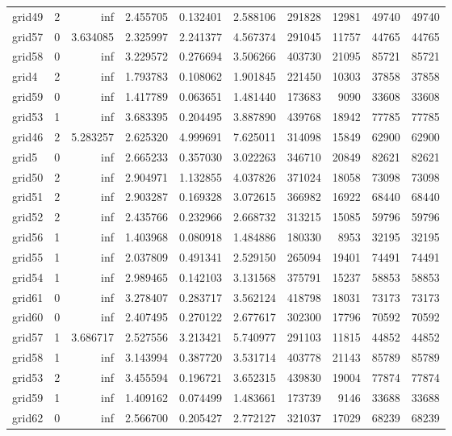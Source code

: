 \documentclass[../../../thesis.tex]{subfiles}
\begin{document}
\begin{longtable}{|l|r|r|r|r|r|r|r|r|r|}
grid49 & 2 & inf & 2.455705 & 0.132401 & 2.588106 & 291828 & 12981 & 49740 & 49740 \\
grid57 & 0 & 3.634085 & 2.325997 & 2.241377 & 4.567374 & 291045 & 11757 & 44765 & 44765 \\
grid58 & 0 & inf & 3.229572 & 0.276694 & 3.506266 & 403730 & 21095 & 85721 & 85721 \\
grid4 & 2 & inf & 1.793783 & 0.108062 & 1.901845 & 221450 & 10303 & 37858 & 37858 \\
grid59 & 0 & inf & 1.417789 & 0.063651 & 1.481440 & 173683 & 9090 & 33608 & 33608 \\
grid53 & 1 & inf & 3.683395 & 0.204495 & 3.887890 & 439768 & 18942 & 77785 & 77785 \\
grid46 & 2 & 5.283257 & 2.625320 & 4.999691 & 7.625011 & 314098 & 15849 & 62900 & 62900 \\
grid5 & 0 & inf & 2.665233 & 0.357030 & 3.022263 & 346710 & 20849 & 82621 & 82621 \\
grid50 & 2 & inf & 2.904971 & 1.132855 & 4.037826 & 371024 & 18058 & 73098 & 73098 \\
grid51 & 2 & inf & 2.903287 & 0.169328 & 3.072615 & 366982 & 16922 & 68440 & 68440 \\
grid52 & 2 & inf & 2.435766 & 0.232966 & 2.668732 & 313215 & 15085 & 59796 & 59796 \\
grid56 & 1 & inf & 1.403968 & 0.080918 & 1.484886 & 180330 & 8953 & 32195 & 32195 \\
grid55 & 1 & inf & 2.037809 & 0.491341 & 2.529150 & 265094 & 19401 & 74491 & 74491 \\
grid54 & 1 & inf & 2.989465 & 0.142103 & 3.131568 & 375791 & 15237 & 58853 & 58853 \\
grid61 & 0 & inf & 3.278407 & 0.283717 & 3.562124 & 418798 & 18031 & 73173 & 73173 \\
grid60 & 0 & inf & 2.407495 & 0.270122 & 2.677617 & 302300 & 17796 & 70592 & 70592 \\
grid57 & 1 & 3.686717 & 2.527556 & 3.213421 & 5.740977 & 291103 & 11815 & 44852 & 44852 \\
grid58 & 1 & inf & 3.143994 & 0.387720 & 3.531714 & 403778 & 21143 & 85789 & 85789 \\
grid53 & 2 & inf & 3.455594 & 0.196721 & 3.652315 & 439830 & 19004 & 77874 & 77874 \\
grid59 & 1 & inf & 1.409162 & 0.074499 & 1.483661 & 173739 & 9146 & 33688 & 33688 \\
grid62 & 0 & inf & 2.566700 & 0.205427 & 2.772127 & 321037 & 17029 & 68239 & 68239 \\

\end{longtable}
\end{document}
